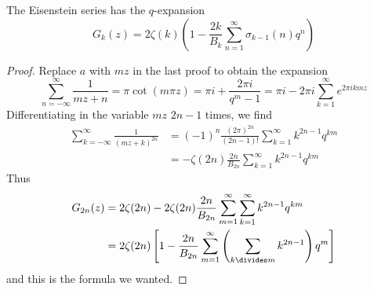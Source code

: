 \begin{theorem}
    The Eisenstein series has the $q$-expansion
    \[ G_k(z) = 2 \zeta(k) \left( 1 - \frac{2k}{B_k} \sum_{n = 1}^\infty \sigma_{k-1}(n) q^n \right) \]
\end{theorem}
\begin{proof}
    Replace $a$ with $mz$ in the last proof to obtain the expansion
    \[ \sum_{n = -\infty}^\infty \frac{1}{mz + n} = \pi \cot(m \pi z) = \pi i + \frac{2 \pi i}{q^m - 1} = \pi i - 2 \pi i \sum_{k = 1}^\infty e^{2 \pi i km z} \]
    Differentiating in the variable $mz$ $2n - 1$ times, we find
    \begin{align*}
        \sum_{k = -\infty}^\infty \frac{1}{(mz + k)^{2n}} &= (-1)^n \frac{(2 \pi)^{2n}}{(2n-1)!} \sum_{k = 1}^\infty k^{2n-1} q^{k m}\\
        &= - \zeta(2n) \frac{2n}{B_{2n}} \sum_{k = 1}^\infty k^{2n - 1} q^{km}
    \end{align*}
    Thus
    \begin{align*} 
        G_{2n}(z) &= 2 \zeta(2n) - 2 \zeta(2n) \frac{2n}{B_{2n}} \sum_{m = 1}^\infty \sum_{k = 1}^\infty k^{2n - 1} q^{km}\\
        &= 2 \zeta(2n) \left[ 1 - \frac{2n}{B_{2n}} \sum_{m = 1}^\infty \left( \sum_{k \divides m} k^{2n-1} \right) q^m \right]
    \end{align*}
    and this is the formula we wanted.
\end{proof}

